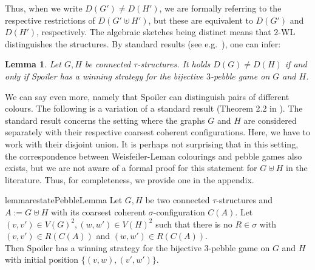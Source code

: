 \documentclass[10pt,a4paper]{article}
\newtheorem{lemma}[theorem]{Lemma}
\begin{document}
	Thus, when we write $D(G') \neq D(H')$, we are formally referring to the respective restrictions of $D(G' \uplus H')$, but these are equivalent to $D(G')$ and $D(H')$, respectively.
	The algebraic sketches being distinct means that $2$-WL distinguishes the structures. By standard results (see e.g.\ \cite{sandraSiglog}), one can infer:
	\begin{lemma}
		\label{lem:sketchesDistinctSpoilerWins}
		Let $G, H$ be connected $\tau$-structures. It holds $D(G) \neq D(H)$ if and only if Spoiler has a winning strategy for the bijective $3$-pebble game on $G$ and $H$. 
	\end{lemma}	
	
	We can say even more, namely that Spoiler can distinguish pairs of different colours. The following is a variation of a standard result (Theorem 2.2 in \cite{sandraSiglog}). The standard result concerns the setting where the graphs $G$ and $H$ are considered separately with their respective coarsest coherent configurations. Here, we have to work with their disjoint union. It is perhaps not surprising that in this setting, the correspondence between Weisfeiler-Leman colourings and pebble games also exists, but we are not aware of a formal proof for this statement for $G \uplus H$ in the literature. Thus, for completeness, we provide one in the appendix.
	\begin{restatable}{lemma}{restatePebbleLemma}
		\label{lem:PC_equivWLPebble}
		Let $G,H$ be two connected $\tau$-structures and $A := G \uplus H$ with its coarsest coherent $\sigma$-configuration $C(A)$. Let $(v,v') \in V(G)^2, (w,w') \in V(H)^2$ such that there is no $R \in \sigma$ with $(v,v') \in R(C(A))$ and $(w,w') \in R(C(A))$.\\
		Then Spoiler has a winning strategy for the bijective 3-pebble game on $G$ and $H$ with initial position $\{(v,w),(v',w')\}$.
	\end{restatable}
	
\end{document}
